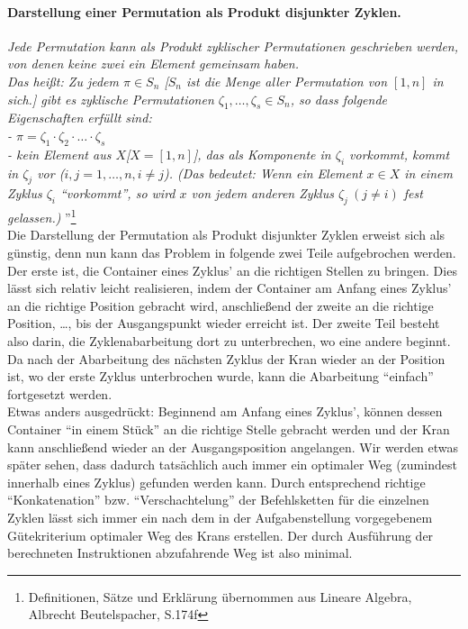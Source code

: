 \paragraph{Darstellung einer Permutation als Produkt disjunkter Zyklen.}
\emph{Jede Permutation kann als Produkt zyklischer Permutationen geschrieben werden, von denen keine zwei ein Element gemeinsam haben.}\\
\emph{Das heißt: Zu jedem $\pi \in S_n$ [$S_n$ ist die Menge aller Permutation von $[1,n]$ in sich.] gibt es zyklische Permutationen $\zeta_1,\dots,\zeta_s \in S_n$,
so dass folgende Eigenschaften erfüllt sind: \\
 - $\pi=\zeta_1\cdot \zeta_2 \cdot \ldots \cdot \zeta_s$ \\
 - kein Element aus $X$[$X=[1,n]$], das als Komponente in $\zeta_i$ vorkommt, kommt in $\zeta_j$ vor ($i,j=1, \dots,n, i \neq j$).
(Das bedeutet: Wenn ein Element $x \in X$ in einem Zyklus $\zeta_i$ ``vorkommt'',
 so wird $x$ von jedem anderen Zyklus $\zeta_j \: (j \neq i)$ fest gelassen.)
}''\footnote{Definitionen, Sätze und Erklärung übernommen aus Lineare Algebra, Albrecht Beutelspacher, S.174f}\\

Die Darstellung der Permutation als Produkt disjunkter Zyklen erweist sich als günstig,
denn nun kann das Problem in folgende zwei Teile aufgebrochen werden.
Der erste ist, die Container eines Zyklus' an die richtigen Stellen zu bringen.
Dies lässt sich relativ leicht realisieren, indem der Container am Anfang eines Zyklus' an die richtige Position gebracht wird,
anschließend der zweite an die richtige Position, \dots, bis der Ausgangspunkt wieder erreicht ist.
Der zweite Teil besteht also darin, die Zyklenabarbeitung dort zu unterbrechen, wo eine andere beginnt.
Da nach der Abarbeitung des nächsten Zyklus der Kran wieder an der Position ist,
wo der erste Zyklus unterbrochen wurde, kann die Abarbeitung ``einfach'' fortgesetzt werden. \\
Etwas anders ausgedrückt:
Beginnend am Anfang eines Zyklus', können dessen Container ``in einem Stück'' an die richtige Stelle gebracht werden
 und der Kran kann anschließend wieder an der Ausgangsposition angelangen.
Wir werden etwas später sehen, dass dadurch tatsächlich auch immer ein optimaler Weg (zumindest innerhalb eines Zyklus) gefunden werden kann.
Durch entsprechend richtige ``Konkatenation'' bzw. ``Verschachtelung'' der Befehlsketten für die einzelnen Zyklen lässt sich immer
 ein nach dem in der Aufgabenstellung vorgegebenem Gütekriterium optimaler Weg des Krans erstellen.
Der durch Ausführung der berechneten Instruktionen abzufahrende Weg ist also minimal. \\

